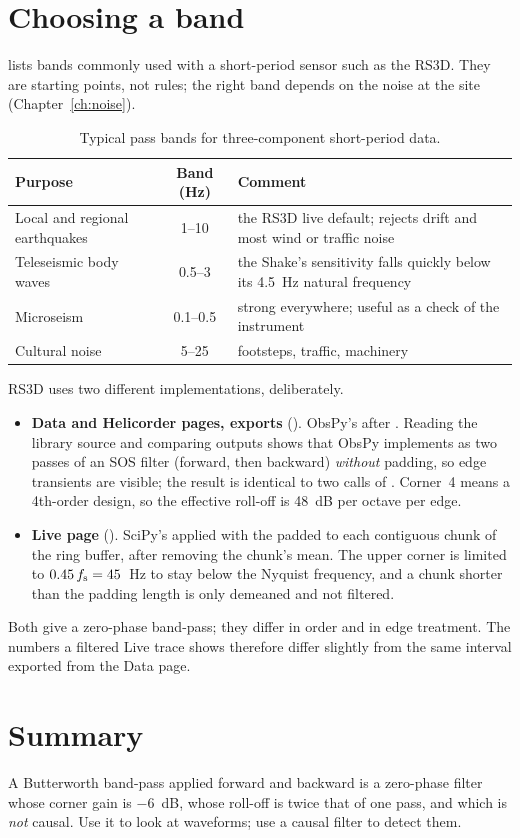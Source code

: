 \section{Choosing a band}
 lists bands commonly used with a short-period sensor such as the RS3D. They are starting points, not
rules; the right band depends on the noise at the site (Chapter~\ref{ch:noise}).

\begin{table}[tbp]
\centering\small
\caption{Typical pass bands for three-component short-period data.}\label{tab:bands}
\begin{tabularx}{\linewidth}{@{}l c X@{}}
\toprule
Purpose & Band (Hz) & Comment\\ \midrule
Local and regional earthquakes & 1--10 & the RS3D live default; rejects drift and most wind or traffic noise\\
Teleseismic body waves & 0.5--3 & the Shake's sensitivity falls quickly below its 4.5~Hz natural frequency\\
Microseism & 0.1--0.5 & strong everywhere; useful as a check of the instrument\\
Cultural noise & 5--25 & footsteps, traffic, machinery\\
\bottomrule
\end{tabularx}
\end{table}

\begin{rs3dapp}
RS3D uses two different implementations, deliberately.
\begin{itemize}
\item \textbf{Data and Helicorder pages, exports} (). ObsPy's
   after .
  Reading the library source and comparing outputs shows that ObsPy implements  as two passes of an
  SOS filter (forward, then backward) \emph{without} padding, so edge transients are visible; the result is identical
  to two calls of . Corner~4 means a 4th-order design, so the effective roll-off is 48~dB per octave per
  edge.
\item \textbf{Live page} (). SciPy's  applied with the
  padded  to each contiguous chunk of the ring buffer, after removing the chunk's mean. The upper
  corner is limited to $0.45\,f_{\mathrm{s}}=45$~Hz to stay below the Nyquist frequency, and a chunk shorter than the padding
  length is only demeaned and not filtered.
\end{itemize}
Both give a zero-phase band-pass; they differ in order and in edge treatment. The numbers a filtered Live trace shows
therefore differ slightly from the same interval exported from the Data page.
\end{rs3dapp}

\section{Summary}
\begin{rs3dkey}
A Butterworth band-pass applied forward and backward is a zero-phase filter whose corner gain is $-6$~dB, whose
roll-off is twice that of one pass, and which is \emph{not} causal. Use it to look at waveforms; use a causal filter
to detect them.
\end{rs3dkey}
